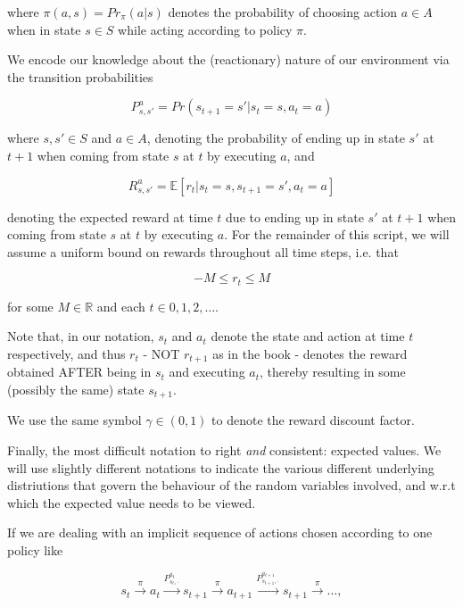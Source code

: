 \documentclass[11pt]{article} %
\begin{document}
where $\pi(a,s) = Pr_{\pi}(a | s)$ denotes the probability of choosing action $a \in A$ when in state $s \in S$ while acting according to policy $\pi$.

We encode our knowledge about the (reactionary) nature of our environment via the transition probabilities

\begin{equation}\label{eq_transProb}
	P_{s,s'}^{a} = Pr(s_{t+1} = s' | s_t = s, a_t = a)
\end{equation}
 
where $s,s' \in S$ and $a \in A$, denoting the probability of ending up in state $s'$ at $t+1$ when coming from state $s$ at $t$ by executing $a$, and 

\begin{equation}\label{eq_rewExpVal}
	R_{s,s'}^{a} = \mathbb{E}[r_t | s_t = s, s_{t+1} = s', a_t = a]
\end{equation}

denoting the expected reward at time $t$ due to ending up in state $s'$ at $t+1$ when coming from state $s$ at $t$ by executing $a$. For the remainder of this script, we will assume a uniform bound on rewards throughout all time steps, i.e. that 

\begin{equation}\label{eq_rewBound}
	-M \le r_t \le M
\end{equation}

for some $M \in \mathbb{R}$ and each $t \in 0,1,2,\dots $.

Note that, in our notation, $s_t$ and $a_t$ denote the state and action at time $t$ respectively, and thus $r_t$ - NOT $r_{t+1}$ as in the book - denotes the reward obtained AFTER being in $s_t$ and executing $a_t$, thereby resulting in some (possibly the same) state $s_{t+1}$.

We use the same symbol $\gamma \in (0,1)$ to denote the reward discount factor.

Finally, the most difficult notation to right \textit{and} consistent: expected values. We will use slightly different notations to indicate the various different underlying distriutions that govern the behaviour of the random variables involved, and w.r.t which the expected value needs to be viewed.

If we are dealing with an implicit sequence of actions chosen according to one policy like 

\begin{equation}\label{eq_trajIm}
	s_t \overset{\pi}{\rightarrow} a_t \overset{P^{a_t}_{s_t,\cdot}}{\rightarrow} s_{t+1} \overset{\pi}{\rightarrow} a_{t+1} \overset{P^{a_{t+1}}_{s_{t+1},\cdot}}{\rightarrow} s_{t+1} \overset{\pi}{\rightarrow} \dots,
\end{equation}
\end{document}
